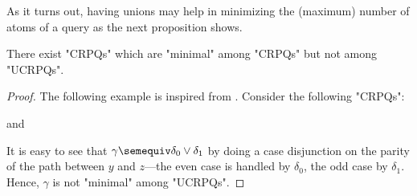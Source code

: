 As it turns out, having unions may help in minimizing the (maximum) number of atoms of a query as the next proposition shows.
\begin{proposition}
	\AP\label{prop:unionsmatter}
	There exist "CRPQs" which are "minimal" among "CRPQs" but not among "UCRPQs".
\end{proposition}
\begin{proof}
	The following example is inspired from \cite[Example 1.2]{FigueiraM23}.
	Consider the following "CRPQs":\leavevmode
	\begin{center}
		\small
		\hspace{.4cm}
		\hspace{.2cm}and\hspace{.2cm}
	\end{center}
	It is easy to see that $\gamma \semequiv \delta_0 \lor \delta_1$ 
	by doing a case disjunction on the parity of the path between $y$ and $z$---the even case
	is handled by $\delta_0$, the odd case by $\delta_1$.
	Hence, $\gamma$ is not "minimal" among "UCRPQs".
	

\end{proof}
